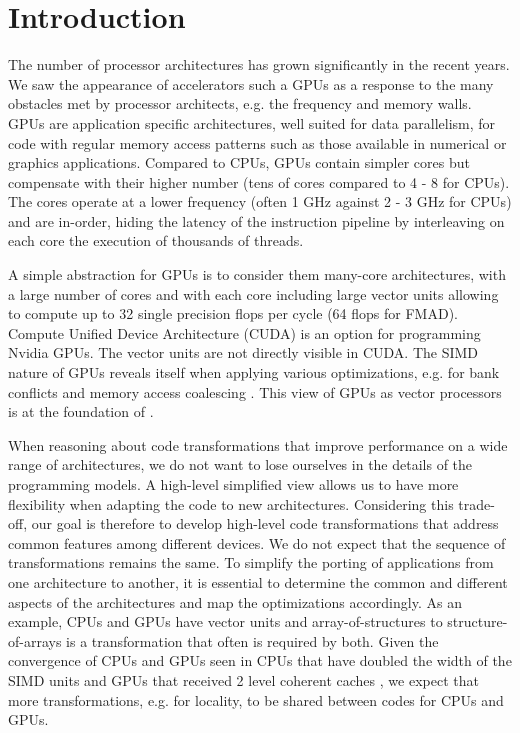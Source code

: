 \section{Introduction}
The number of processor architectures has grown significantly in the recent
years. We saw the appearance of accelerators such a GPUs as a response to the
many obstacles met by processor architects, e.g. the frequency and memory walls.
GPUs are application specific architectures, well suited for data parallelism,
for code with regular memory access patterns such as those available in
numerical or graphics applications. Compared to CPUs, GPUs contain simpler cores
but compensate with their higher number (tens of cores compared to 4 - 8 for
CPUs). The cores operate at a lower frequency (often 1 GHz against 2 - 3 GHz for
CPUs) and are in-order, hiding the latency of the instruction pipeline by
interleaving on each core the execution of thousands of threads.

A simple abstraction for GPUs is to consider them many-core architectures, with
a large number of cores and with each core including large vector units
allowing to compute up to 32 single precision flops per cycle (64 flops for
FMAD). Compute Unified Device Architecture (CUDA) is an option for programming
Nvidia GPUs. The vector units are not directly visible in CUDA. The SIMD nature
of GPUs reveals itself when applying various optimizations, e.g. for bank
conflicts and memory access coalescing \cite{cuda}. This view of GPUs as vector
processors is at the foundation of \cite{Volkov:2008:BGT:1413370.1413402}.

When reasoning about code transformations that improve performance on a wide
range of architectures, we do not want to lose ourselves in the details of the
programming models. A high-level simplified view allows us to have more
flexibility when adapting the code to new architectures. Considering this
trade-off, our goal is therefore to develop high-level code transformations that
address common features among different devices. We do not expect that the
sequence of transformations remains the same. To simplify the porting of
applications from one architecture to another, it is essential to determine the
common and different aspects of the architectures and map the optimizations
accordingly. As an example, CPUs and GPUs have vector units and
array-of-structures to structure-of-arrays is a transformation that often is
required by both. Given the convergence of CPUs and GPUs seen in CPUs that have
doubled the width of the SIMD units and GPUs that received 2 level coherent
caches \cite{fermi}, we expect that more transformations, e.g. for locality, to
be shared between codes for CPUs and GPUs.

